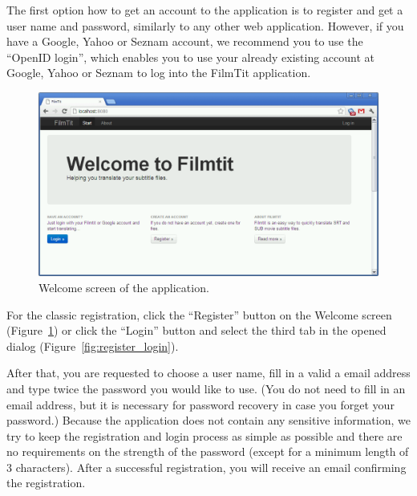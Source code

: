 The first option how to get an account to the application is to register and get a user name and password, similarly to any other web application. However, if you have a Google, Yahoo or Seznam account, we recommend you to use the ``OpenID login'', which enables you to use your already existing account at Google, Yahoo or Seznam to log into the FilmTit application.

\begin{figure}[h]
\begin{center}
\includegraphics[scale=0.4]{figures/user_manual/welcome_screen.png}
\end{center}
\caption{Welcome screen of the application.}
\label{fig:welcome}
\end{figure}

For the classic registration, click the ``Register'' button on the Welcome screen (Figure~\ref{fig:welcome}) or click the ``Login'' button and select the third tab in the opened dialog (Figure~\ref{fig:register_login}).

After that, you are requested to choose a user name, fill in a valid a email address and type twice the password you would like to use. (You do not need to fill in an email address, but it is necessary for password recovery in case you forget your password.) Because the application does not contain any sensitive information, we try to keep the registration and login process as simple as possible and there are no requirements on the strength of the password (except for a minimum length of 3 characters). After a successful registration, you will receive an email confirming the registration.

